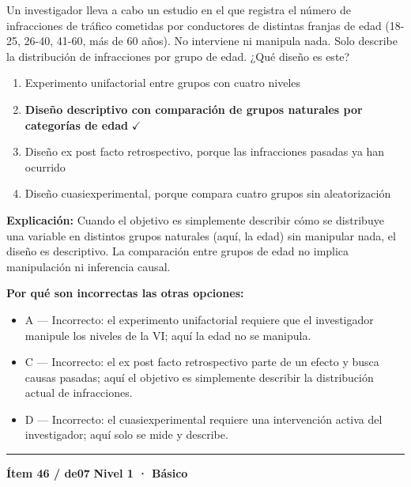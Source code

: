 \documentclass[12pt,a4paper]{article}
\begin{document}
Un investigador lleva a cabo un estudio en el que registra el número de infracciones de tráfico cometidas por conductores de distintas franjas de edad (18-25, 26-40, 41-60, más de 60 años). No interviene ni manipula nada. Solo describe la distribución de infracciones por grupo de edad. ¿Qué diseño es este?

\begin{enumerate}
  \item[A.] Experimento unifactorial entre grupos con cuatro niveles
  \item[\textbf{\color{verde}B.}] \textbf{\color{verde} Diseño descriptivo con comparación de grupos naturales por categorías de edad} \hfill $\checkmark$
  \item[C.] Diseño ex post facto retrospectivo, porque las infracciones pasadas ya han ocurrido
  \item[D.] Diseño cuasiexperimental, porque compara cuatro grupos sin aleatorización
\end{enumerate}

\noindent\textbf{\color{azul}Explicación:} Cuando el objetivo es simplemente describir cómo se distribuye una variable en distintos grupos naturales (aquí, la edad) sin manipular nada, el diseño es descriptivo. La comparación entre grupos de edad no implica manipulación ni inferencia causal.

\noindent\textbf{\color{gris}Por qué son incorrectas las otras opciones:}
\begin{itemize}
  \item {\small A — Incorrecto: el experimento unifactorial requiere que el investigador manipule los niveles de la VI; aquí la edad no se manipula.}
  \item {\small C — Incorrecto: el ex post facto retrospectivo parte de un efecto y busca causas pasadas; aquí el objetivo es simplemente describir la distribución actual de infracciones.}
  \item {\small D — Incorrecto: el cuasiexperimental requiere una intervención activa del investigador; aquí solo se mide y describe.}
\end{itemize}
\vspace{8pt}\hrule\vspace{10pt}

\begin{mdframed}[backgroundcolor=fondogris,linecolor=azul,linewidth=1pt,innerleftmargin=10pt,innerrightmargin=10pt,innertopmargin=7pt,innerbottommargin=7pt]
\textbf{Ítem 46 / de07} \hfill {\small\bfseries\color{azul} Nivel 1 · Básico}
\end{mdframed}
\end{document}
